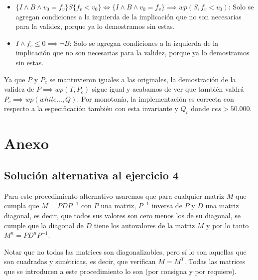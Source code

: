 \documentclass[10pt,a4paper]{article}
\begin{document}
\begin{itemize}
	Entonces, si sumamos todos los habitantes de la lista $ciudades$, este n\'umero mayor a 50.000 ser\'a sumado. 
	La \'unica forma de que la sumatoria total no sea mayor a 50.000 ser\'ia si existiera alg\'un n\'umero negativo entre los que se suman.
	Sabemos que esto no sucede gracias a otra condici\'on de $P$: 
	\begin{equation}
		\paraTodo[unalinea]{i}{\ent}{0 \le i < |ciudades| \implicaLuego ciudades[i].habitantes \ge 0}
	\end{equation}
	Por lo tanto, $(res = \sum\nolimits_{j=0}^{|ciudades| - 1} ciudades[j].habitantes \land P) \implies res > 50.000$
	\item $\{I \land B \land v_{0} = f_{v}\}S\{f_{v} < v_{0}\} \iff \{I \land B \land v_{0} = f_{v}\} \implies wp(S, f_{v} < v_{0})$: Solo se agregan condiciones a la izquierda de la implicación 
	que no son necesarias para la validez, porque ya lo demostramos sin estas. 
	\item $I \land f_{v} \le 0 \implies \neg B$: Solo se agregan condiciones a la izquierda de la implicación 
	que no son necesarias para la validez, porque ya lo demostramos sin estas. 
\end{itemize}

Ya que $P$ y $P_{c}$ se mantuvieron iguales a las originales, la demostración de la validez de $P \implies wp(T, P_{c})$ sigue igual y acabamos de ver que también valdrá $P_{c} \implies wp(while..., Q)$. 
Por monotonía, la implementación es correcta con respecto a la especificación también con esta invariante y $Q_{c}$ donde $res > 50.000$.
	
\section{Anexo}
	\subsection{Solución alternativa al ejercicio 4}
		Para este procedimiento alternativo usaremos que para cualquier matriz $M$ que cumpla que $M = PDP^{-1}$ con $P$ una matriz,
		$P^{-1}$ inversa de $P$ y $D$ una matriz diagonal, es decir, que todos sus valores son cero menos los de su diagonal, se cumple que la diagonal
		de $D$ tiene los autovalores de la matriz $M$ y por lo tanto $M^{n} = PD^{n}P^{-1}$.
		
		Notar que no todas las matrices son diagonalizables, pero sí lo son aquellas que son cuadradas y simétricas,
		es decir, que verifican $M = M^{T}$. Todas las matrices que se introducen a este procedimiento lo son (por consigna y por requiere).
		
\end{document}
